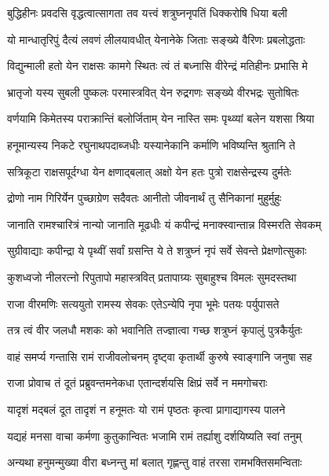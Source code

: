 \twolineshloka
{बुद्धिहीनः प्रवदसि वृद्धत्वात्सागता तव}
{यत्त्वं शत्रुघ्ननृपतिं धिक्करोषि धिया बली}%

\twolineshloka
{यो मान्धातृरिपुं दैत्यं लवणं लीलयावधीत्}
{येनानेके जिताः सङ्ख्ये वैरिणः प्रबलोद्धताः}%

\twolineshloka
{विद्युन्माली हतो येन राक्षसः कामगे स्थितः}
{त्वं तं बध्नासि वीरेन्द्रं मतिहीनः प्रभासि मे}%

\twolineshloka
{भ्रातृजो यस्य सुबली पुष्कलः परमास्त्रवित्}
{येन रुद्रगणः सङ्ख्ये वीरभद्रः सुतोषितः}%

\twolineshloka
{वर्णयामि किमेतस्य पराक्रान्तिं बलोर्जिताम्}
{येन नास्ति समः पृथ्व्यां बलेन यशसा श्रिया}%

\twolineshloka
{हनूमान्यस्य निकटे रघुनाथपदाब्जधीः}
{यस्यानेकानि कर्माणि भविष्यन्ति श्रुतानि ते}%

\twolineshloka
{सत्रिकूटा राक्षसपूर्दग्धा येन क्षणाद्बलात्}
{अक्षो येन हतः पुत्रो राक्षसेन्द्रस्य दुर्मतेः}%

\twolineshloka
{द्रोणो नाम गिरिर्येन पुच्छाग्रेण सदैवतः}
{आनीतो जीवनार्थं तु सैनिकानां मुहुर्मुहुः}%

\twolineshloka
{जानाति रामश्चारित्रं नान्यो जानाति मूढधीः}
{यं कपीन्द्रं मनाक्स्वान्तान्न विस्मरति सेवकम्}%

\twolineshloka
{सुग्रीवाद्याः कपीन्द्रा ये पृथ्वीं सर्वां ग्रसन्ति ये}
{ते शत्रुघ्नं नृपं सर्वे सेवन्ते प्रेक्षणोत्सुकाः}%

\twolineshloka
{कुशध्वजो नीलरत्नो रिपुतापो महास्त्रवित्}
{प्रतापाग्र्यः सुबाहुश्च विमलः सुमदस्तथा}%

\twolineshloka
{राजा वीरमणिः सत्ययुतो रामस्य सेवकः}
{एतेऽन्येपि नृपा भूमेः पतयः पर्युपासते}%

\twolineshloka
{तत्र त्वं वीर जलधौ मशकः को भवानिति}
{तज्ज्ञात्वा गच्छ शत्रुघ्नं कृपालुं पुत्रकैर्युतः}%

\twolineshloka
{वाहं समर्प्य गन्तासि रामं राजीवलोचनम्}
{दृष्ट्वा कृतार्थी कुरुषे स्वाङ्गानि जनुषा सह}%


\twolineshloka
{राजा प्रोवाच तं दूतं प्रब्रुवन्तमनेकधा}
{एतान्दर्शयसि क्षिप्रं सर्वे न ममगोचराः}%

\twolineshloka
{यादृशं मद्बलं दूत तादृशं न हनूमतः}
{यो रामं पृष्ठतः कृत्वा प्रागाद्यागस्य पालने}%

\twolineshloka
{यद्यहं मनसा वाचा कर्मणा कुतुकान्वितः}
{भजामि रामं तर्ह्याशु दर्शयिष्यति स्वां तनुम्}%

\twolineshloka
{अन्यथा हनुमन्मुख्या वीरा बध्नन्तु मां बलात्}
{गृह्णन्तु वाहं तरसा रामभक्तिसमन्विताः}%


